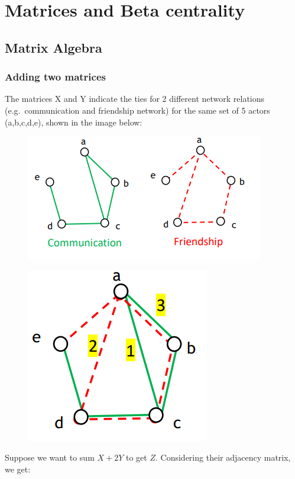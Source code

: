 \documentclass[
  notitlepage,
  onecolumn,
  openany]{book}
\begin{document}
\hypertarget{matrices-and-beta-centrality}{%
\chapter{Matrices and Beta centrality}\label{matrices-and-beta-centrality}}

\hypertarget{matrix-algebra}{%
\section{Matrix Algebra}\label{matrix-algebra}}

\hypertarget{adding-two-matrices}{%
\subsection{Adding two matrices}\label{adding-two-matrices}}

The matrices X and Y indicate the ties for 2 different network relations (e.g.~communication and friendship network) for the same set of 5 actors (a,b,c,d,e), shown in the image below:

\begin{figure}[h!]

{\centering \includegraphics[width=0.4\linewidth]{images/05-Matrices and Beta centrality/Untitled} 

}

\end{figure}

\begin{figure}[h!]

{\centering \includegraphics[width=0.25\linewidth]{images/05-Matrices and Beta centrality/Untitled 1} 

}

\end{figure}

Suppose we want to sum \(X+2Y\) to get \(Z\). Considering their adjacency matrix, we get:
\end{document}
